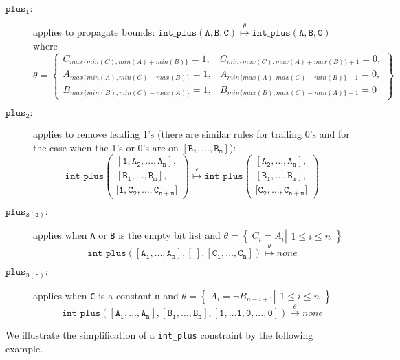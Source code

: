 \documentclass{tlp}
\newcommand{\sset}[2]{\left\{~#1  \left|
      \begin{array}{l}#2\end{array}
    \right.     \right\}}
\begin{document}
\begin{description}
\item[$\mathtt{plus_1}:$] applies to propagate bounds:
$
\mathtt{int\_plus(A,B,C)} 
   \overset{\theta}{\longmapsto}
\mathtt{int\_plus(A,B,C)} 
$
where \\
\hspace*{-7mm}$\theta=\left\{
\begin{array}{ll}
C_{max\{min(C), min(A)+min(B)\}} = 1, & C_{min\{max(C), max(A)+max(B)\}+1} = 0,\\
A_{max\{min(A), min(C)-max(B)\}} = 1, & A_{min\{max(A), max(C)-min(B)\}+1} = 0, \\
B_{max\{min(B), min(C)-max(A)\}} = 1, & B_{min\{max(B), max(C)-min(A)\}+1} = 0
\end{array}\right\}
$\smallskip
\item[$\mathtt{plus_{2}}:$] applies to remove leading 1's  
 (there are similar rules for trailing 0's and for the case when
 the 1's or 0's are on $\mathtt{[B_1,\ldots,B_m]}$):
\[
\mathtt{int\_plus}\left(\begin{array}{l}
  \mathtt{[1,A_2,\ldots,A_{n}], }\\
  \mathtt{[B_1,\ldots,B_m],}\\
  \mathtt{{[}1,C_2,\ldots,C_{n+m}{]}} 
\end{array}\right)
   \overset{\epsilon}{\longmapsto}
\mathtt{int\_plus}\left(\begin{array}{l}
  \mathtt{[A_2,\ldots,A_{n}], }\\
  \mathtt{[B_1,\ldots,B_m],}\\
  \mathtt{{[}C_2,\ldots,C_{n+m}{]}} 
\end{array}\right)
\]
\item[$\mathtt{plus_{3(a)}}:$] applies when \texttt{A} or \texttt{B}
  is the empty bit list and $\theta = \sset{C_{i}=A_i}{1 \leq i \leq
    n}$
\[
\mathtt{int\_plus([A_1,\ldots,A_n], [~], [C_1,\ldots,C_n])}
   \overset{\theta}{\longmapsto} none
\]


\item[$\mathtt{plus_{3(b)}}:$] applies when \texttt{C} is a constant
  \texttt{n} and $\theta = \sset{A_{i}=\neg B_{n-i+1}}{1 \leq i
    \leq n}$
\[
\mathtt{int\_plus([A_1,\ldots,A_n], [B_1,\ldots,B_n], [1,\ldots1,0,\ldots,0])}
   \overset{\theta}{\longmapsto}
none
\]
  
\end{description}

We illustrate the simplification of a \texttt{int\_plus} constraint by
the following example.
\end{document}
